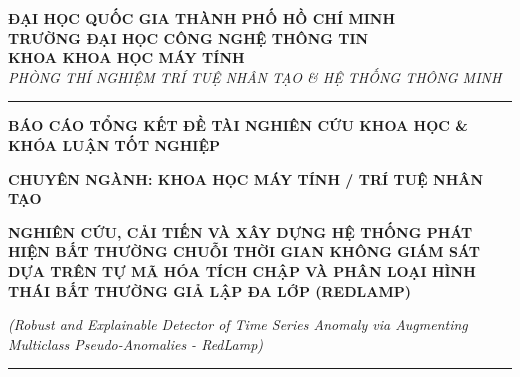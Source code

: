 \documentclass[11pt,journal,onecolumn]{IEEEtran}
\begin{document}






\begin{titlepage}
\begin{center}
    \large \textbf{ĐẠI HỌC QUỐC GIA THÀNH PHỐ HỒ CHÍ MINH}\\
    \large \textbf{TRƯỜNG ĐẠI HỌC CÔNG NGHỆ THÔNG TIN}\\
    \large \textbf{KHOA KHOA HỌC MÁY TÍNH}\\
    \large \textit{PHÒNG THÍ NGHIỆM TRÍ TUỆ NHÂN TẠO \& HỆ THỐNG THÔNG MINH}
    
    \vspace{2.0cm}
    \rule{\linewidth}{1.5pt}
    
    \vspace{0.8cm}
    {\Large \textbf{BÁO CÁO TỔNG KẾT ĐỀ TÀI NGHIÊN CỨU KHOA HỌC \& KHÓA LUẬN TỐT NGHIỆP}\par}
    \vspace{0.5cm}
    {\large \textbf{CHUYÊN NGÀNH: KHOA HỌC MÁY TÍNH / TRÍ TUỆ NHÂN TẠO}\par}
    
    \vspace{1.2cm}
    {\LARGE \textbf{NGHIÊN CỨU, CẢI TIẾN VÀ XÂY DỰNG HỆ THỐNG PHÁT HIỆN BẤT THƯỜNG CHUỖI THỜI GIAN KHÔNG GIÁM SÁT DỰA TRÊN TỰ MÃ HÓA TÍCH CHẬP VÀ PHÂN LOẠI HÌNH THÁI BẤT THƯỜNG GIẢ LẬP ĐA LỚP (REDLAMP)}\par}
    
    \vspace{0.4cm}
    {\large \textit{(Robust and Explainable Detector of Time Series Anomaly via Augmenting Multiclass Pseudo-Anomalies - RedLamp)}\par}
    
    \rule{\linewidth}{1.5pt}
    

\end{center}
\end{titlepage}
\end{document}
